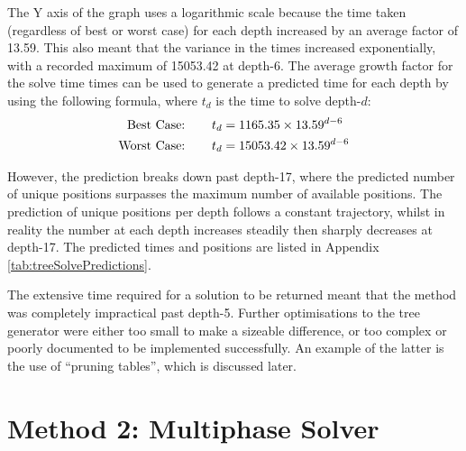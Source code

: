 \documentclass{report}
\newcommand{\depth}[1]{depth-#1}
\begin{document}
    The Y axis of the graph uses a logarithmic scale because the time taken (regardless of best or worst case) for each depth increased by an average factor of 13.59. This also meant that the variance in the times increased exponentially, with a recorded maximum of 15053.42 at \depth{6}. The average growth factor for the solve time times can be used to generate a predicted time for each depth by using the following formula, where $t_d$ is the time to solve \depth{$d$}:
   	\begin{align*}
   	\text{Best Case:}\hspace{7.5mm} 	&	t_d = 1165.35 \times 13.59^{d-6} \\
	\text{Worst Case:}\hspace{7.5mm}	&	t_d = 15053.42 \times 13.59^{d-6}
   	\end{align*}
   	
    However, the prediction breaks down past \depth{17}, where the predicted number of unique positions surpasses the maximum number of available positions. The prediction of unique positions per depth follows a constant trajectory, whilst in reality the number at each depth increases steadily then sharply decreases at \depth{17}. The predicted times and positions are listed in Appendix \ref{tab:treeSolvePredictions}.
    
    The extensive time required for a solution to be returned meant that the method was completely impractical past \depth{5}. Further optimisations to the tree generator were either too small to make a sizeable difference, or too complex or poorly documented to be implemented successfully. An example of the latter is the use of \enquote{pruning tables}, which is discussed later.
    
	\section{Method 2: Multiphase Solver}
	
\end{document}

